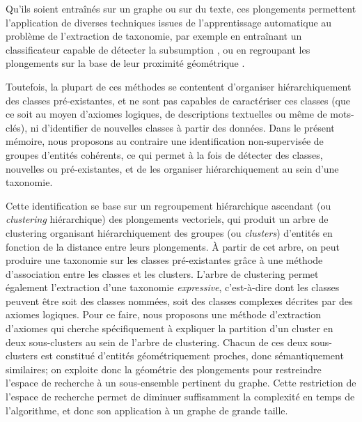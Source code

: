 
Qu'ils soient entraînés sur un graphe ou sur du texte, ces plongements permettent l'application de diverses techniques issues de l'apprentissage automatique au problème de l'extraction de taxonomie, par exemple en entraînant un classificateur capable de détecter la subsumption \cite{fu2014learning}, ou en regroupant les plongements sur la base de leur proximité géométrique \cite{gupta2016domain, zhang2018taxogen}.


Toutefois, la plupart de ces méthodes se contentent d'organiser hiérarchiquement des classes pré-existantes, et ne sont pas capables de caractériser ces classes (que ce soit au moyen d'axiomes logiques, de descriptions textuelles ou même de mots-clés), ni d'identifier de nouvelles classes à partir des données.
%
Dans le présent mémoire, nous proposons au contraire une identification non-supervisée de groupes d'entités cohérents, ce qui permet à la fois de détecter des classes, nouvelles ou pré-existantes, et de les organiser hiérarchiquement au sein d'une taxonomie.

Cette identification se base sur un regroupement hiérarchique ascendant (ou \textit{clustering} hiérarchique) des plongements vectoriels, qui produit un arbre de clustering organisant hiérarchiquement des groupes (ou \textit{clusters}) d'entités en fonction de la distance entre leurs plongements. À partir de cet arbre, on peut produire une taxonomie sur les classes pré-existantes grâce à une méthode d'association entre les classes et les clusters. L'arbre de clustering permet également l'extraction d'une taxonomie \textit{expressive}, c'est-à-dire dont les classes peuvent être soit des classes nommées, soit des classes complexes décrites par des axiomes logiques. Pour ce faire, nous proposons une méthode d'extraction d'axiomes qui cherche spécifiquement à expliquer la partition d'un cluster en deux sous-clusters au sein de l'arbre de clustering. Chacun de ces deux sous-clusters est constitué d'entités géométriquement proches, donc sémantiquement similaires; on exploite donc la géométrie des plongements pour restreindre l'espace de recherche à un sous-ensemble pertinent du graphe. Cette restriction de l'espace de recherche permet de diminuer suffisamment la complexité en temps de l'algorithme, et donc son application à un graphe de grande taille.


